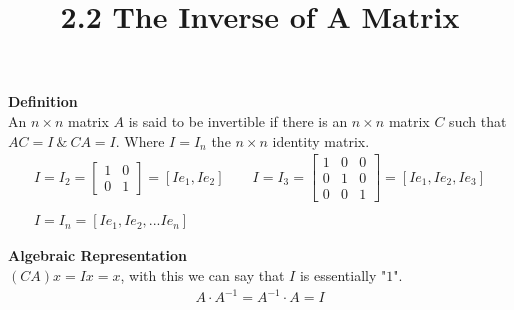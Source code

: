 \documentclass{article}
\title{2.2 The Inverse of A Matrix}
\begin{document}
  \maketitle
  \textbf{Definition}\\
  An $ n \times n $ matrix $ A $ is said to be invertible if there is an $ n \times n $ matrix $ C $ such that $ AC = I ~\&~ CA=I$. Where $ I = I_{n} $ the $ n \times n $ identity matrix. 
  \[
    \begin{gathered}
    I=I_{2} = \begin{bmatrix}
      1 &0\\
      0 &1
    \end{bmatrix} = [Ie_{1},Ie_{2}  ] \qquad
    I = I_{3} = \begin{bmatrix}
      1 &0 &0\\
      0 &1 &0\\
      0 &0 &1
    \end{bmatrix} = [Ie_{1},Ie_{2},Ie_{3}   ]\\
    ~\\
    I=I_{n} = [Ie_{1}, Ie_{2},...Ie_{n}]  
    \end{gathered}
  \]
  
  \textbf{Algebraic Representation}\\
  $ (CA)x = Ix = x $, with this we can say that $ I $ is essentially "$ 1 $". 
  \[
    \begin{gathered}
    A \cdot A^{-1} = A^{-1} \cdot A = I  
    \end{gathered}
  \] 
\end{document}

